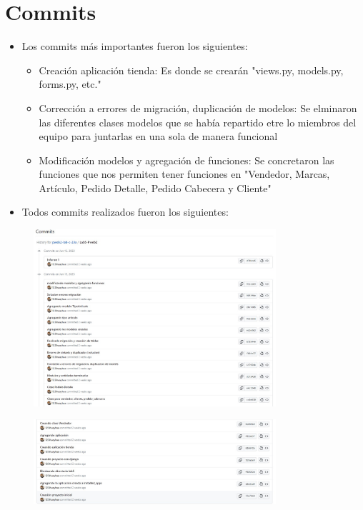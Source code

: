 \documentclass{article}
\begin{document}
    \section{Commits}
    \begin{itemize}
        \item Los commits más importantes fueron los siguientes:
        \begin{itemize}
            \item Creación aplicación tienda: Es donde se crearán "views.py, models.py, forms.py, etc."
            \item Corrección a errores de migración, duplicación de modelos: Se elminaron las diferentes clases modelos que se había repartido etre lo miembros del equipo para juntarlas en una sola de manera funcional
            \item Modificación modelos y agregación de funciones: Se concretaron las funciones que nos permiten tener funciones en "Vendedor, Marcas, Artículo, Pedido Detalle, Pedido Cabecera y Cliente"
        \end{itemize}
        \item Todos commits realizados fueron los siguientes:
    \end{itemize}
    \begin{figure}[H]
		      \centering
                \includegraphics[width=0.8\textwidth,keepaspectratio]{img/C1.jpeg}
	   \end{figure}
    \begin{figure}[H]
		      \centering
                \includegraphics[width=0.8\textwidth,keepaspectratio]{img/C2.jpeg}
	\end{figure}
\clearpage
\end{document}
